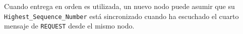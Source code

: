 Cuando entrega en orden es utilizada, un nuevo nodo puede asumir que su \texttt{Highest\_Sequence\_Number} está sincronizado cuando ha escuchado el cuarto mensaje de \texttt{REQUEST} desde el mismo nodo.































